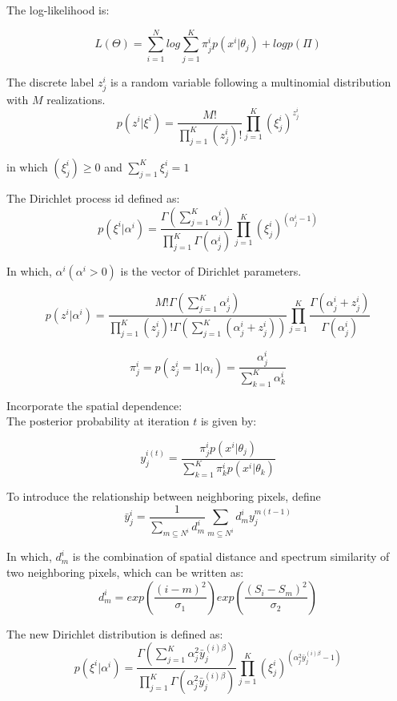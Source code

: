 \documentclass{bioinfo}
\begin{document}
The log-likelihood is:

$$L(\Theta )=\sum_{i=1}^{N}log{\sum_{j=1}^{K}\pi^i_jp(x^i|\theta_j)}+logp(\Pi )$$

The discrete label $z^i_j$ is a random variable following a multinomial distribution with $M$ realizations.\\

$$p(z^i|\xi ^i)=\frac{M!}{\prod_{j=1}^{K}(z^i_j)!}\prod_{j=1}^{K}(\xi ^i_j)^{z^i_j}$$

in which $(\xi ^i_j)\ge0$ and $\sum_{j=1}^{K}\xi ^i_j=1$

The Dirichlet process id defined as:\\

$$p(\xi ^i|\alpha^i)=\frac{\Gamma (\sum_{j=1}^{K}\alpha^i_j)}{\prod_{j=1}^{K}\Gamma (\alpha^i_j)}\prod_{j=1}^{K}(\xi^i_j)^{(\alpha^i_j-1)}$$

In which, $\alpha^i (\alpha^i>0)$ is the vector of Dirichlet parameters.

$$p(z^i|\alpha^i)=\frac{M!\Gamma (\sum_{j=1}^{K}\alpha^i_j)}{\prod_{j=1}^{K}(z^i_j)!\Gamma (\sum_{j=1}^{K}(\alpha^i_j+z^i_j))}\prod_{j=1}^{K}{\frac{\Gamma(\alpha^i_j+z^i_j)}{\Gamma(\alpha^i_j)}}$$

$$\pi^i_j=p(z^i_j=1|\alpha_i)=\frac{\alpha^i_j}{\sum_{k=1}^{K}\alpha^i_k}$$

Incorporate the spatial dependence:\\

The posterior probability at iteration $t$ is given by:


$$y^{i(t)}_j=\frac{\pi^i_jp(x^i|\theta_j)}{\sum_{k=1}^{K}\pi^i_kp(x^i|\theta_k)}$$

To introduce the relationship between neighboring pixels, define\\

$$\bar{y}^{i}_j=\frac{1}{\sum_{m\subseteq N^i}d^i_m}\sum_{m\subseteq N^i}d^i_{m}y^{m(t-1)}_j$$

In which, $d^i_m$ is the combination of spatial distance and spectrum similarity of two neighboring pixels, which can be written as:\\

$$d^i_m=exp(\frac{(i-m)^2}{\sigma_1})exp(\frac{(S_i-S_m)^2}{\sigma_2})$$

The new Dirichlet distribution is defined as:\\
$$p(\xi ^i|\alpha^i)=\frac{\Gamma (\sum_{j=1}^{K}\alpha_j^2 \bar{y}^{(i)\beta}_j)}{\prod_{j=1}^{K}\Gamma (\alpha_j^2 \bar{y}^{(i)\beta}_j)}\prod_{j=1}^{K}(\xi^i_j)^{(\alpha_j^2 \bar{y}^{(i)\beta}_j-1)}$$
\end{document}
